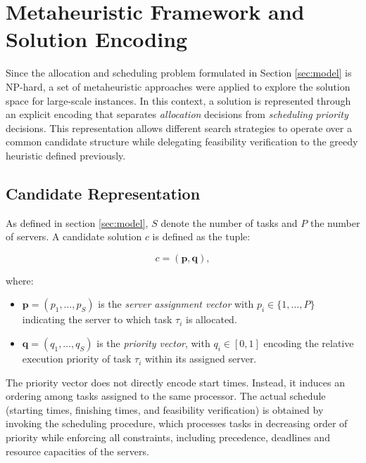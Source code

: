 \documentclass[11pt,a4paper]{article}
\begin{document}
\section{Metaheuristic Framework and Solution Encoding}

Since the allocation and scheduling problem formulated in Section \ref{sec:model} is NP-hard, a set of metaheuristic approaches were applied to explore the solution space for large-scale instances. In this context, a solution is represented through an explicit encoding that separates \emph{allocation} decisions from \emph{scheduling priority} decisions. This representation allows different search strategies to operate over a common candidate structure while delegating feasibility verification to the greedy heuristic defined previously.

\subsection{Candidate Representation}

As defined in section \ref{sec:model}, $S$ denote the number of tasks and $P$ the number of servers. A candidate solution $c$ is defined as the tuple:

\begin{equation}
c = (\mathbf{p}, \mathbf{q}),
\label{eq:encoding}
\end{equation}


where:

\begin{itemize}
    \item $\mathbf{p} = (p_1, \dots, p_{S})$ is the \emph{server assignment vector} with $p_i \in \{1,\dots,P\}$ indicating the server to which task $\tau_i$ is allocated.
    
    \item $\mathbf{q} = (q_1, \dots, q_{S})$ is the \emph{priority vector}, with $q_i \in [0,1]$ encoding the relative execution priority of task $\tau_i$ within its assigned server.
\end{itemize}

The priority vector does not directly encode start times. Instead, it induces an ordering among tasks assigned to the same processor. The actual schedule (starting times, finishing times, and feasibility verification) is obtained by invoking the scheduling procedure, which processes tasks in decreasing order of priority while enforcing all constraints, including precedence, deadlines and resource capacities of the servers.
\end{document}
